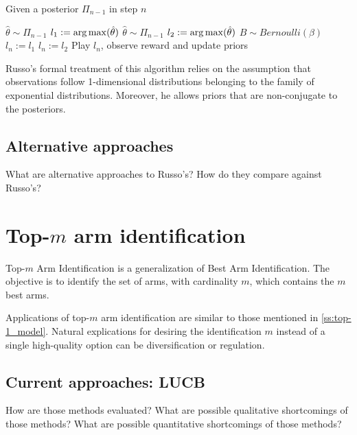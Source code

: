 \begin{algorithm}[H]
    \caption{Given a posterior $\Pi_{n-1}$ in step $n$}
    \label{alg:TTTS}
  \begin{algorithmic}
    \State $\hat{\theta} \sim \Pi_{n-1}$
    \State $l_1 := \operatorname*{arg\,max}(\hat{\theta})$
    \Repeat
      \State $\hat{\theta} \sim \Pi_{n-1}$
      \State $l_2 := \operatorname*{arg\,max}(\hat{\theta})$
    \State $B \sim Bernoulli(\beta)$
      \State $l_n := l_1$
    \Else
      \State $l_n := l_2$
    \EndIf
    \State Play $l_n$, observe reward and update priors
  \end{algorithmic}
\end{algorithm}

Russo's formal treatment of this algorithm relies on the assumption that
observations follow 1-dimensional distributions belonging to the family of
exponential distributions. Moreover, he allows priors that are non-conjugate to
the posteriors.

\subsection{Alternative approaches}
What are alternative approaches to Russo's?
How do they compare against Russo's?

\section{Top-$m$ arm identification}

Top-$m$ Arm Identification is a generalization of Best Arm Identification. The
objective is to identify the set of arms, with cardinality $m$, which contains
the $m$ best arms.

Applications of top-$m$ arm identification are similar to those mentioned in
\ref{ss:top-1_model}. Natural explications for desiring the identification $m$
instead of a single high-quality option can be diversification or regulation.

\subsection{Current approaches: LUCB}
How are those methods evaluated?
What are possible qualitative shortcomings of those methods?
What are possible quantitative shortcomings of those methods?

